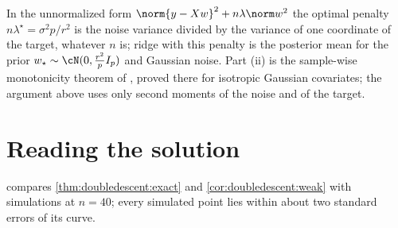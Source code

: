 \begin{refsection}
In the unnormalized form $\norm{y-Xw}^2+n\lambda\norm w^2$ the optimal penalty $n\lambda^\star=\sigma^2p/r^2$ is the noise variance divided by the variance of one coordinate of the target, whatever $n$ is; ridge with this penalty is the posterior mean for the prior $w_\star\sim\cN(0,\frac{r^2}pI_p)$ and Gaussian noise. Part (ii) is the sample-wise monotonicity theorem of \textcite{NakkiranEtAl2021}, proved there for isotropic Gaussian covariates; the argument above uses only second moments of the noise and of the target.

\section{Reading the solution}\label{sec:doubledescent:reading}

 compares \cref{thm:doubledescent:exact} and \cref{cor:doubledescent:weak} with simulations at $n=40$; every simulated point lies within about two standard errors of its curve.


\end{refsection}
